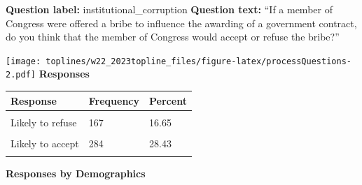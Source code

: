 \documentclass[]{article}
\begin{document}
\clearpage\pagebreak
\begin{flushleft} \textbf{Question label:} institutional\_corruption \break \break \textbf{Question text:} ``If a member of Congress were offered a bribe to influence the awarding of a government contract, do you think that the member of Congress would accept or refuse the bribe?'' \end{flushleft}

\texttt{[image: toplines/w22\_2023topline\_files/figure-latex/processQuestions-2.pdf]}
\textbf{Responses}

\begin{tabu} to 
\toprule
Response & Frequency & Percent\\
\midrule
{} &  & \\
Likely to refuse & 167 & 16.65\\
 &  & \\
Likely to accept & 284 & 28.43\\
 &  & \\
\bottomrule
\end{tabu}

\textbf{Responses by Demographics}\begingroup\fontsize{7}{9}\selectfont
\end{document}

